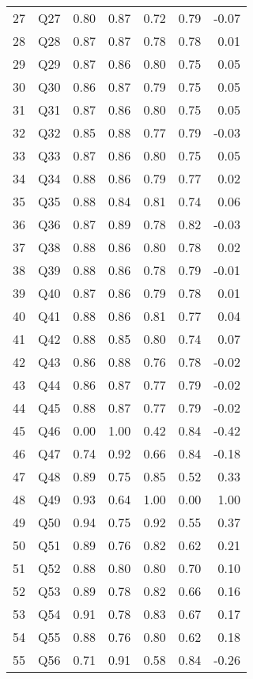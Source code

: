 \documentclass{amsart}
\begin{document}
\begin{table}[ht]
\begin{tabular}{rlrrrrr}
  27 & Q27 & 0.80 & 0.87 & 0.72 & 0.79 & -0.07 \\ 
  28 & Q28 & 0.87 & 0.87 & 0.78 & 0.78 & 0.01 \\ 
  29 & Q29 & 0.87 & 0.86 & 0.80 & 0.75 & 0.05 \\ 
  30 & Q30 & 0.86 & 0.87 & 0.79 & 0.75 & 0.05 \\ 
  31 & Q31 & 0.87 & 0.86 & 0.80 & 0.75 & 0.05 \\ 
  32 & Q32 & 0.85 & 0.88 & 0.77 & 0.79 & -0.03 \\ 
  33 & Q33 & 0.87 & 0.86 & 0.80 & 0.75 & 0.05 \\ 
  34 & Q34 & 0.88 & 0.86 & 0.79 & 0.77 & 0.02 \\ 
  35 & Q35 & 0.88 & 0.84 & 0.81 & 0.74 & 0.06 \\ 
  36 & Q36 & 0.87 & 0.89 & 0.78 & 0.82 & -0.03 \\ 
  37 & Q38 & 0.88 & 0.86 & 0.80 & 0.78 & 0.02 \\ 
  38 & Q39 & 0.88 & 0.86 & 0.78 & 0.79 & -0.01 \\ 
  39 & Q40 & 0.87 & 0.86 & 0.79 & 0.78 & 0.01 \\ 
  40 & Q41 & 0.88 & 0.86 & 0.81 & 0.77 & 0.04 \\ 
  41 & Q42 & 0.88 & 0.85 & 0.80 & 0.74 & 0.07 \\ 
  42 & Q43 & 0.86 & 0.88 & 0.76 & 0.78 & -0.02 \\ 
  43 & Q44 & 0.86 & 0.87 & 0.77 & 0.79 & -0.02 \\ 
  44 & Q45 & 0.88 & 0.87 & 0.77 & 0.79 & -0.02 \\ 
  45 & Q46 & 0.00 & 1.00 & 0.42 & 0.84 & -0.42 \\ 
  46 & Q47 & 0.74 & 0.92 & 0.66 & 0.84 & -0.18 \\ 
  47 & Q48 & 0.89 & 0.75 & 0.85 & 0.52 & 0.33 \\ 
  48 & Q49 & 0.93 & 0.64 & 1.00 & 0.00 & 1.00 \\ 
  49 & Q50 & 0.94 & 0.75 & 0.92 & 0.55 & 0.37 \\ 
  50 & Q51 & 0.89 & 0.76 & 0.82 & 0.62 & 0.21 \\ 
  51 & Q52 & 0.88 & 0.80 & 0.80 & 0.70 & 0.10 \\ 
  52 & Q53 & 0.89 & 0.78 & 0.82 & 0.66 & 0.16 \\ 
  53 & Q54 & 0.91 & 0.78 & 0.83 & 0.67 & 0.17 \\ 
  54 & Q55 & 0.88 & 0.76 & 0.80 & 0.62 & 0.18 \\ 
  55 & Q56 & 0.71 & 0.91 & 0.58 & 0.84 & -0.26 \\ 

\end{tabular}
\end{table}
\end{document}
